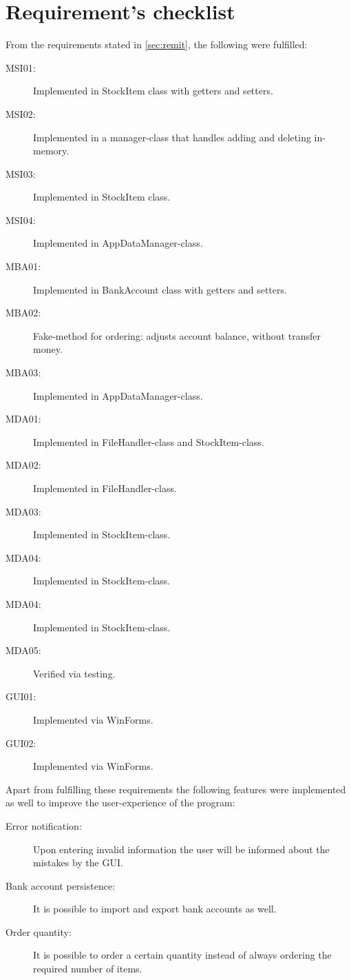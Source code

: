 \chapter{Requirement's checklist}\label{ch:requirements} %

From the requirements stated in \autoref{sec:remit}, the following were fulfilled:

\begin{description}
\item[MSI01:] Implemented in StockItem class with getters and setters.
\item[MSI02:] Implemented in a manager-class that handles adding and deleting in-memory.
\item[MSI03:] Implemented in StockItem class.
\item[MSI04:] Implemented in AppDataManager-class.
\item[MBA01:] Implemented in BankAccount class with getters and setters.
\item[MBA02:] Fake-method for ordering: adjusts account balance, without transfer money.
\item[MBA03:] Implemented in AppDataManager-class.
\item[MDA01:] Implemented in FileHandler-class and StockItem-class.
\item[MDA02:] Implemented in FileHandler-class.
\item[MDA03:] Implemented in StockItem-class.
\item[MDA04:] Implemented in StockItem-class.
\item[MDA04:] Implemented in StockItem-class.
\item[MDA05:] Verified via testing.
\item[GUI01:] Implemented via WinForms.
\item[GUI02:] Implemented via WinForms.
\end{description}

Apart from fulfilling these requirements the following features were implemented as well to improve the user-experience of the program:

\begin{description}
\item[Error notification:] Upon entering invalid information the user will be informed about the mistakes by the \ac{GUI}.
\item[Bank account persistence:] It is possible to import and export bank accounts as well.
\item[Order quantity:] It is possible to order a certain quantity instead of always ordering the required number of items.
\end{description}